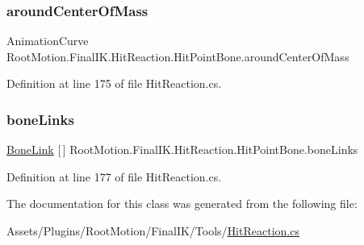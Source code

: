 \subsubsection{\texorpdfstring{around\+Center\+Of\+Mass}{aroundCenterOfMass}}
{\footnotesize\ttfamily Animation\+Curve Root\+Motion.\+Final\+I\+K.\+Hit\+Reaction.\+Hit\+Point\+Bone.\+around\+Center\+Of\+Mass}



Definition at line 175 of file Hit\+Reaction.\+cs.

\mbox{\label{class_root_motion_1_1_final_i_k_1_1_hit_reaction_1_1_hit_point_bone_a1def1047ea3f76f20a4efcc88ca21784}} 
\subsubsection{\texorpdfstring{bone\+Links}{boneLinks}}
{\footnotesize\ttfamily \mbox{\hyperlink{class_root_motion_1_1_final_i_k_1_1_hit_reaction_1_1_hit_point_bone_1_1_bone_link}{Bone\+Link}} \mbox{[}$\,$\mbox{]} Root\+Motion.\+Final\+I\+K.\+Hit\+Reaction.\+Hit\+Point\+Bone.\+bone\+Links}



Definition at line 177 of file Hit\+Reaction.\+cs.



The documentation for this class was generated from the following file\+:\begin{DoxyCompactItemize}
\item 
Assets/\+Plugins/\+Root\+Motion/\+Final\+I\+K/\+Tools/\mbox{\hyperlink{_hit_reaction_8cs}{Hit\+Reaction.\+cs}}\end{DoxyCompactItemize}
